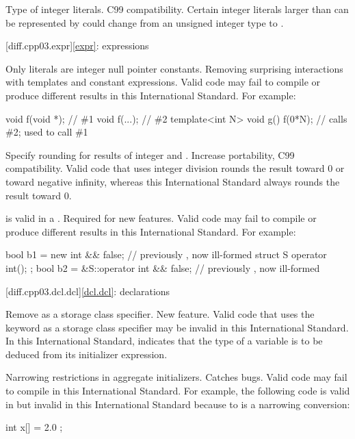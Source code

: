 \change
Type of integer literals.
\rationale
C99 compatibility.
\effect
Certain integer literals larger than can be represented by  could
change from an unsigned integer type to .

[diff.cpp03.expr]{\ref{expr}: expressions}

\change
Only literals are integer null pointer constants.
\rationale
Removing surprising interactions with templates and constant
expressions.
\effect
Valid \CppIII{} code may fail to compile or produce different results in
this International Standard.
For example:
\begin{codeblock}
void f(void *);     // \#1
void f(...);        // \#2
template<int N> void g() {
  f(0*N);           // calls \#2; used to call \#1
}
\end{codeblock}

\change
Specify rounding for results of integer \tcode{/} and \tcode{\%}.
\rationale
Increase portability, C99 compatibility.
\effect
Valid \CppIII{} code that uses integer division rounds the result toward 0 or
toward negative infinity, whereas this International Standard always rounds
the result toward 0.

\change
\tcode{\&\&} is valid in a .
\rationale
Required for new features.
\effect
Valid \CppIII{} code may fail to compile or produce different results in
this International Standard.
For example:
\begin{codeblock}
bool b1 = new int && false;             // previously , now ill-formed
struct S { operator int(); };
bool b2 = &S::operator int && false;    // previously , now ill-formed
\end{codeblock}

[diff.cpp03.dcl.dcl]{\ref{dcl.dcl}: declarations}

\change
Remove  as a storage class specifier.
\rationale
New feature.
\effect
Valid \CppIII{} code that uses the keyword  as a storage class
specifier may be invalid in this International Standard. In this International
Standard,  indicates that the type of a variable is to be deduced
from its initializer expression.

\change
Narrowing restrictions in aggregate initializers.
\rationale
Catches bugs.
\effect
Valid \CppIII{} code may fail to compile in this International Standard. For
example, the following code is valid in \CppIII{} but invalid in this
International Standard because  to  is a narrowing
conversion:
\begin{codeblock}
int x[] = { 2.0 };
\end{codeblock}

